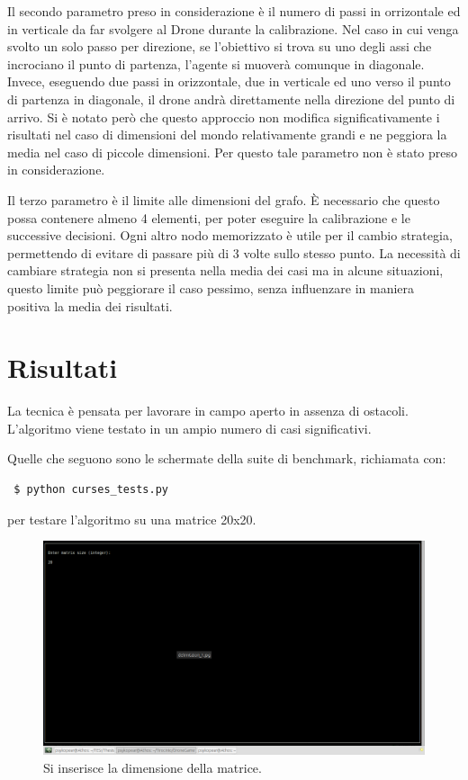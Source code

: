 Il secondo parametro preso in considerazione è il numero di passi in orrizontale ed in verticale da far svolgere al Drone durante la calibrazione. Nel caso in cui venga svolto un solo passo per direzione, se l'obiettivo si trova su uno degli assi che incrociano il punto di partenza, l'agente si muoverà comunque in diagonale. Invece, eseguendo due passi in orizzontale, due in verticale ed uno verso il punto di partenza in diagonale, il drone andrà direttamente nella direzione del punto di arrivo. Si è notato però che questo approccio non modifica significativamente i risultati nel caso di dimensioni del mondo relativamente grandi e ne peggiora la media nel caso di piccole dimensioni. Per questo tale parametro non è stato preso in considerazione.

Il terzo parametro è il limite alle dimensioni del grafo. È necessario che questo possa contenere almeno 4 elementi, per poter eseguire la calibrazione e le successive decisioni. Ogni altro nodo memorizzato è utile per il cambio strategia, permettendo di evitare di passare più di 3 volte sullo stesso punto. La necessità di cambiare strategia non si presenta nella media dei casi ma in alcune situazioni, questo limite può peggiorare il caso pessimo, senza influenzare in maniera positiva la media dei risultati.
	
\section{Risultati}
La tecnica è pensata per lavorare in campo aperto in assenza di ostacoli. L'algoritmo viene testato in un ampio numero di casi significativi.

Quelle che seguono sono le schermate della suite di benchmark, richiamata con:

\begin{verbatim} $ python curses_tests.py \end{verbatim}

per testare l'algoritmo su una matrice 20x20.

\begin{figure}[hb]
\center
\includegraphics[width=\textwidth]{immagini/Test1-1.png}
\caption{Si inserisce la dimensione della matrice.}
\end{figure}

